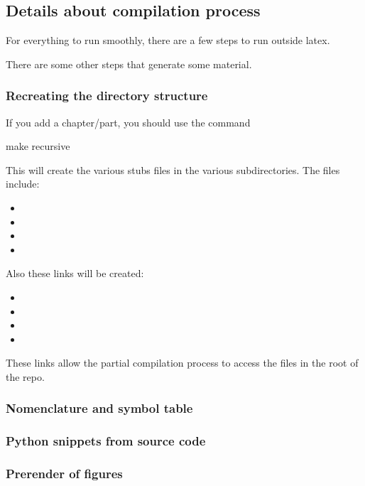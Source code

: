 \subsection{Details about compilation process}

For everything to run smoothly, there are a few steps to run outside latex.

There are some other steps that generate some material.

\subsubsection{Recreating the directory structure}

If you add a chapter/part, you should use the command

\begin{console}
  make recursive
\end{console}

This will create the various stubs files in the various subdirectories.
The files include:
\begin{itemize}
  \item {}
  \item {}
  \item {}
  \item {}
\end{itemize}
Also these links will be created:
\begin{itemize}
  \item {}
  \item {}
  \item {}
  \item {}
\end{itemize}
These links allow the partial compilation process to access the files in the root of the repo.

\subsubsection{Nomenclature and symbol table}


\subsubsection{Python snippets from source code}


\subsubsection{Prerender of figures}

